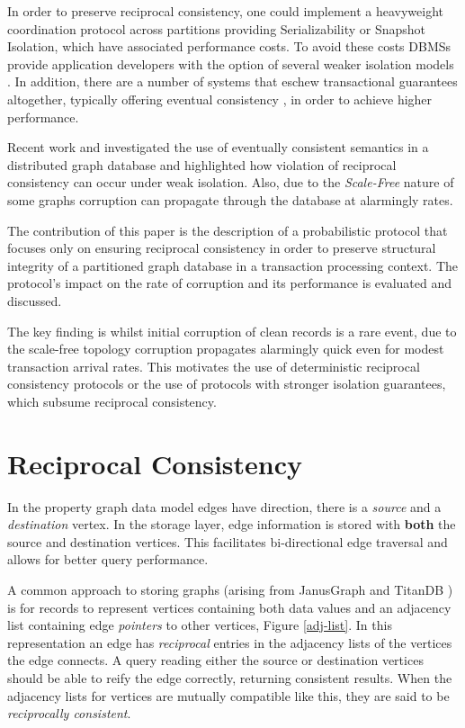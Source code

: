 \documentclass[sigplan,10pt]{acmart}
\begin{document}
In order to preserve reciprocal consistency, one could implement a heavyweight coordination protocol across partitions providing Serializability or Snapshot Isolation, which have associated performance costs. To avoid these costs DBMSs provide application developers with the option of several weaker isolation models \cite{Berenson1995}. In addition, there are a number of systems that eschew transactional guarantees altogether, typically offering eventual consistency \cite{Bailis2013}, in order to achieve higher performance.

Recent work \cite{Ezhilchelvan2018} and \cite{Webber2019} investigated the use of eventually consistent semantics in a distributed graph database and highlighted how violation of reciprocal consistency can occur under weak isolation. Also, due to the \emph{Scale-Free} \cite{ScaleFree} nature of some graphs corruption can propagate through the database at alarmingly rates.

The contribution of this paper is the description of a probabilistic protocol that focuses only on ensuring reciprocal consistency in order to preserve structural integrity of a partitioned graph database in a transaction processing context. The protocol's impact on the rate of corruption and its performance is evaluated and discussed.

The key finding is whilst initial corruption of clean records is a rare event, due to the scale-free topology corruption propagates alarmingly quick even for modest transaction arrival rates. This motivates the use of deterministic reciprocal consistency protocols or the use of protocols with stronger isolation guarantees, which subsume reciprocal consistency.

\section{Reciprocal Consistency}
\label{sec:recipr-cons}

In the property graph data model edges have direction, there is a \emph{source} and a \emph{destination} vertex. In the storage layer, edge information is stored with \textbf{both} the source and destination vertices. This facilitates bi-directional edge traversal and allows for better query performance.

A common approach to storing graphs (arising from JanusGraph \cite{janusgraph} and TitanDB \cite{TitanDB}) is for records to represent vertices containing both data values and an adjacency list containing edge \emph{pointers} to other vertices, Figure \ref{adj-list}. In this representation an edge has \emph{reciprocal} entries in the adjacency lists of the vertices the edge connects. A query reading either the source or destination vertices should be able to reify the edge correctly, returning consistent results. When the adjacency lists for vertices are mutually compatible like this, they are said to be \emph{reciprocally consistent}.
\end{document}
